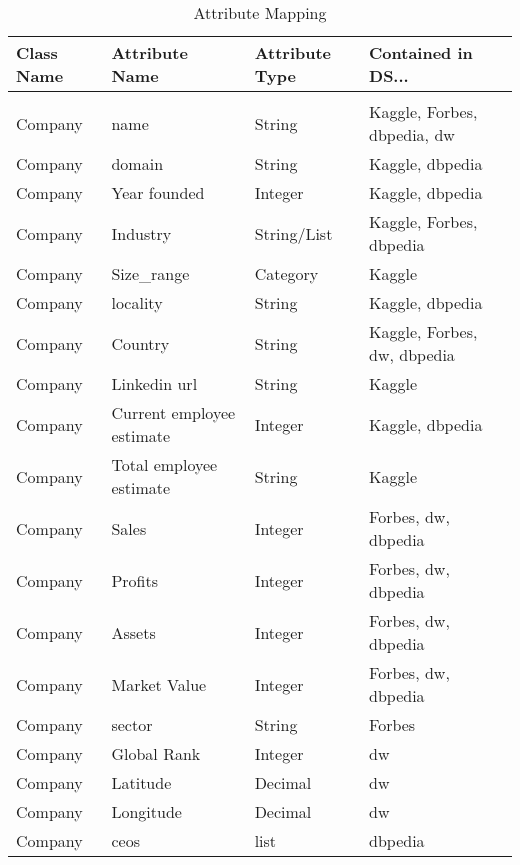 \documentclass[11pt,titlepage,oneside,openany]{article}
\begin{document}
\begin{table}[t]
	\small
	\label{tab:attribute-mapping}
	\begin{tabularx}{\textwidth}{llll}
		Class Name   & Attribute   Name            & Attribute Type & Contained in DS... \\\hline
		&&&\\
		Company      & name                        & String         & Kaggle, Forbes,   dbpedia, dw              \\
		Company      & domain                      & String         & Kaggle, dbpedia                            \\
		Company & Year founded                & Integer        & Kaggle, dbpedia                            \\
		Company      & Industry                    & String/List    & Kaggle, Forbes, dbpedia                    \\
		Company      & Size\_range                 & Category       & Kaggle \\
		Company      & locality                    & String         & Kaggle, dbpedia                            \\
		Company      & Country                     & String         & Kaggle, Forbes, dw,   dbpedia              \\
		Company      & Linkedin url                & String         & Kaggle                                     \\
		Company      & Current   employee estimate & Integer        & Kaggle, dbpedia                            \\
		Company      & Total employee   estimate   & String         & Kaggle                                     \\
		Company      & Sales                       & Integer        & Forbes, dw, dbpedia                        \\
		Company      & Profits                     & Integer        & Forbes, dw, dbpedia                        \\
		Company      & Assets                      & Integer        & Forbes, dw, dbpedia                        \\
		Company      & Market Value                & Integer        & Forbes, dw, dbpedia                        \\
		Company      & sector                      & String         & Forbes                                     \\
		Company      & Global Rank                 & Integer        & dw                                         \\
		Company      & Latitude                    & Decimal        & dw                                         \\
		Company      & Longitude                   & Decimal        & dw                                         \\
		Company      & ceos                        & list           & dbpedia                                   
	\end{tabularx}
\caption{Attribute Mapping}
\end{table}
\end{document}

